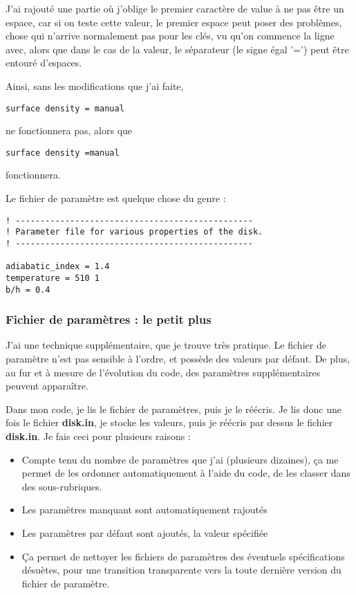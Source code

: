 \begin{attention}
J'ai rajouté une partie où j'oblige le premier caractère de value à ne pas être un espace, car si on teste cette valeur, le premier espace peut poser des problèmes, chose qui n'arrive normalement pas pour les clés, vu qu'on commence la ligne avec, alors que dans le cas de la valeur, le séparateur (le signe égal '=') peut être entouré d'espaces.

Ainsi, sans les modifications que j'ai faite, 
\begin{verbatim}
surface density = manual
\end{verbatim}
ne fonctionnera pas, alors que
\begin{verbatim}
surface density =manual
\end{verbatim}
fonctionnera.
\end{attention}


Le fichier de paramètre est quelque chose du genre :
\begin{verbatim}
! ------------------------------------------------
! Parameter file for various properties of the disk. 
! ------------------------------------------------

adiabatic_index = 1.4
temperature = 510 1
b/h = 0.4
\end{verbatim}

\subsubsection{Fichier de paramètres : le petit plus}
J'ai une technique supplémentaire, que je trouve très pratique. Le fichier de paramètre n'est pas sensible à l'ordre, et possède des valeurs par défaut. De plus, au fur et à mesure de l'évolution du code, des paramètres supplémentaires peuvent apparaître. 

Dans mon code, je lis le fichier de paramètres, puis je le réécris. Je lis donc une fois le fichier \textbf{disk.in}, je stocke les valeurs, puis je réécris par dessus le fichier \textbf{disk.in}. Je fais ceci pour plusieurs raisons : 
\begin{itemize}
\item Compte tenu du nombre de paramètres que j'ai (plusieurs dizaines), ça me permet de les ordonner automatiquement à l'aide du code, de les classer dans des sous-rubriques. 
\item Les paramètres manquant sont automatiquement rajoutés
\item Les paramètres par défaut sont ajoutés, la valeur spécifiée
\item Ça permet de nettoyer les fichiers de paramètres des éventuels spécifications désuètes, pour une transition transparente vers la toute dernière version du fichier de paramètre.
\end{itemize}

